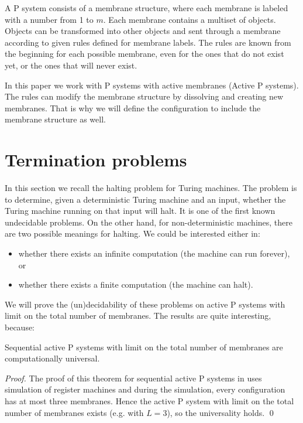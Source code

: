 \documentclass[llncs,submission,copyright,creativecommons]{../lib/lncs/llncs}
\begin{document}
A P system consists of a membrane structure, where each membrane is labeled with a number from 1 to $m$. Each membrane contains a multiset of objects. Objects can be transformed into other objects and sent through a membrane according to given rules defined for membrane labels. The rules are known from the beginning for each possible membrane, even for the ones that do not exist yet, or the ones that will never exist.

In this paper we work with P systems with active membranes (Active P systems). The rules can modify the membrane structure by dissolving and creating new membranes. That is why we will define the configuration to include the membrane structure as well.




\section{Termination problems} %
\label{sec:termination_problems}

In this section we recall the halting problem for Turing machines. The problem is to determine, given a deterministic Turing machine and an input, whether the Turing machine running on that input will halt. It is one of the first known undecidable problems. On the other hand, for non-deterministic machines, there are two possible meanings for halting. We could be interested either in:
\begin{itemize}
  \item whether there exists an infinite computation (the machine can run forever), or
  \item whether there exists a finite computation (the machine can halt).
\end{itemize}

We will prove the (un)decidability of these problems on active P systems with limit on the total number of membranes. The results are quite interesting, because:

\begin{theorem}
  Sequential active P systems with limit on the total number of membranes are computationally universal.
\end{theorem}

\begin{proof}
  The proof of this theorem for sequential active P systems in \cite{Ibarra05Active} uses simulation of register machines and during the simulation, every configuration has at most three membranes. Hence the active P system with limit on the total number of membranes exists (e.g. with $L=3$), so the universality holds.
  \qed
\end{proof}
\end{document}

